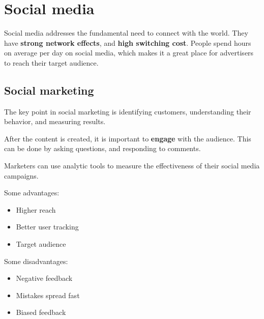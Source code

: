 \section{Social media}

Social media addresses the fundamental need to connect with the world. They have \textbf{strong network effects}, and \textbf{high switching cost}. People spend hours on average per day on social media, which makes it a great place for advertisers to reach their target audience.

\subsection{Social marketing}

The key point in social marketing is identifying customers, understanding their behavior, and measuring results.

After the content is created, it is important to \textbf{engage} with the audience. This can be done by asking questions, and responding to comments.

Marketers can use analytic tools to measure the effectiveness of their social media campaigns.

Some advantages:
\begin{itemize}
    \item Higher reach
    \item Better user tracking
    \item Target audience
\end{itemize}

Some disadvantages:
\begin{itemize}
    \item Negative feedback
    \item Mistakes spread fast
    \item Biased feedback
\end{itemize}